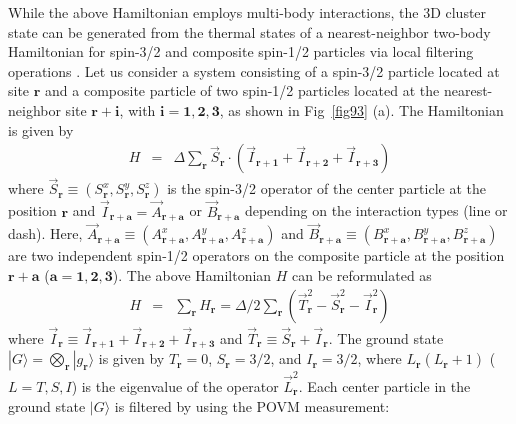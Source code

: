 While the above Hamiltonian employs multi-body interactions, the 3D cluster state can be generated from the thermal states of a nearest-neighbor two-body Hamiltonian for spin-3/2 and composite spin-1/2 particles via local filtering operations \cite{LiKwek,FujiiMoriTher}.
Let us consider a system consisting of a spin-3/2 particle located at site $\mathbf{r}$ and a composite particle of two spin-1/2 particles located at the nearest-neighbor site $\mathbf{r}+\mathbf{i}$, with $\mathbf{i}=\mathbf{1},\mathbf{2},\mathbf{3}$, as shown in Fig~\ref{fig93} (a).
The Hamiltonian is given by
\begin{eqnarray*}
 H&=& \Delta  \sum _{\mathbf{r}} \vec{S} _{\mathbf{r}} \cdot (\vec{I}_{ \mathbf{r} + \mathbf{1}}+\vec{I}_{\mathbf{r} +\mathbf{2}}+ \vec{I}_{\mathbf{r} +\mathbf{3}} )
\end{eqnarray*}
where $\vec{S}_{\mathbf{r}} \equiv (S_{\mathbf{r}}^x,S_{\mathbf{r}}^y,S_{\mathbf{r}}^z)$ is the spin-3/2 operator of the center particle at the position $\mathbf{r}$ and $\vec{I}_{\mathbf{r} + \mathbf{a}} = \vec A _{\mathbf{r} + \mathbf{a}} $ or $\vec B_{\mathbf{r}+ \mathbf{a}}$ depending on the interaction types (line or dash). 
Here, $\vec A _{\mathbf{r} + \mathbf{a}}\equiv (A_{\mathbf{r} +\mathbf{a}}^x,A_{\mathbf{r} +\mathbf{a}}^y,A_{\mathbf{r}+\mathbf{a}}^z)$ and 
$\vec B_{\mathbf{r}+ \mathbf{a}}\equiv (B_{\mathbf{r} +\mathbf{a}}^x,B_{\mathbf{r} +\mathbf{a}}^y,B_{\mathbf{r}+\mathbf{a}}^z)$ are two independent spin-1/2 operators on the composite particle at the position $\mathbf{r} + \mathbf{a}$ ($\mathbf{a} = \mathbf{1} , \mathbf{2}, \mathbf{3}$).
The above Hamiltonian $H$ can be reformulated as
\begin{eqnarray*}
H
&=&  \sum _{\mathbf{r}} H_{\mathbf{r}} =\Delta /2 \sum _{\mathbf{r}}
( \vec{T}^2  _{\mathbf{r}} - \vec{S}^2 _{\mathbf{r}}  -  \vec {I}_{\mathbf{r}} ^2)
 \end{eqnarray*}
where $\vec{I}_{\mathbf{r}} \equiv  \vec{I} _{\mathbf{r} + \mathbf{1}}+\vec{I} _{\mathbf{r} + \mathbf{2}}+\vec{I} _{\mathbf{r} + \mathbf{3}}$ and 
$\vec T _{\mathbf{r}} \equiv \vec S_{\mathbf{r}} + \vec I _{\mathbf{r}}$.
The ground state $|G \rangle = \bigotimes _{\mathbf{r}} |g_{\mathbf{r}} \rangle$ is given by $T_{\mathbf{r}} =0$, $S_{\mathbf{r}} =3/2$, and $I_{\mathbf{r}} =3/2$, where $L_{\mathbf{r}}(L_{\mathbf{r}}+1)$ ($L=T,S,I$) is the eigenvalue of the operator $\vec L_{\mathbf{r}}^2$.
Each center particle in the ground state $|G\rangle$ is filtered by using the POVM measurement: 
